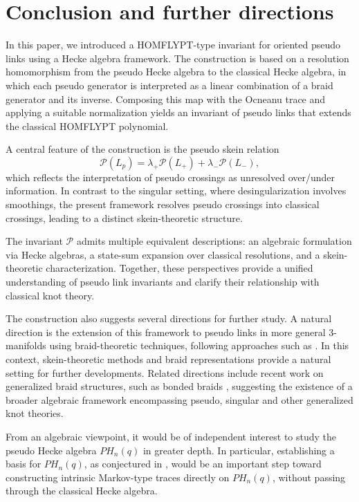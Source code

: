 \documentclass[11pt]{article}
\numberwithin{equation}{section}
\theoremstyle{definition}
\begin{document}

\section{Conclusion and further directions}\label{concl}

In this paper, we introduced a HOMFLYPT-type invariant for oriented pseudo links using a Hecke algebra framework. The construction is based on a resolution homomorphism from the pseudo Hecke algebra to the classical Hecke algebra, in which each pseudo generator is interpreted as a linear combination of a braid generator and its inverse. Composing this map with the Ocneanu trace and applying a suitable normalization yields an invariant of pseudo links that extends the classical HOMFLYPT polynomial.

A central feature of the construction is the pseudo skein relation
\[
\mathcal P(L_p)
=
\lambda_+ \mathcal P(L_+)
+
\lambda_- \mathcal P(L_-),
\]
which reflects the interpretation of pseudo crossings as unresolved over/under information. In contrast to the singular setting, where desingularization involves smoothings, the present framework resolves pseudo crossings into classical crossings, leading to a distinct skein-theoretic structure.

The invariant \(\mathcal P\) admits multiple equivalent descriptions: an algebraic formulation via Hecke algebras, a state-sum expansion over classical resolutions, and a skein-theoretic characterization. Together, these perspectives provide a unified understanding of pseudo link invariants and clarify their relationship with classical knot theory.

The construction also suggests several directions for further study. A natural direction is the extension of this framework to pseudo links in more general 3-manifolds using braid-theoretic techniques, following approaches such as \cite{Lambropoulou1999,DiamantisPseudoST}. In this context, skein-theoretic methods and braid representations provide a natural setting for further developments. Related directions include recent work on generalized braid structures, such as bonded braids \cite{DKL}, suggesting the existence of a broader algebraic framework encompassing pseudo, singular and other generalized knot theories.

From an algebraic viewpoint, it would be of independent interest to study the pseudo Hecke algebra \(PH_n(q)\) in greater depth. In particular, establishing a basis for \(PH_n(q)\), as conjectured in \cite{DiamantisPseudoST}, would be an important step toward constructing intrinsic Markov-type traces directly on \(PH_n(q)\), without passing through the classical Hecke algebra.
\end{document}
